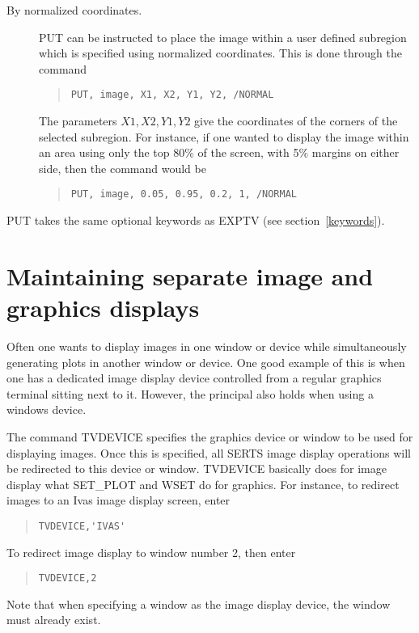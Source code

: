 \begin{description}
\item[By normalized coordinates.]
PUT can be instructed to place the image within a user defined subregion which
is specified using normalized coordinates.  This is done through the command
\begin{quote}
\begin{verbatim}
PUT, image, X1, X2, Y1, Y2, /NORMAL
\end{verbatim}
\end{quote}
The parameters $X1,X2,Y1,Y2$ give the coordinates of the corners of the
selected subregion.  For instance, if one wanted to display the image within an
area using only the top 80\% of the screen, with 5\% margins on either side,
then the command would be
\begin{quote}
\begin{verbatim}
PUT, image, 0.05, 0.95, 0.2, 1, /NORMAL
\end{verbatim}
\end{quote}
\end{description}

PUT takes the same optional keywords as EXPTV (see section~\ref{keywords}).

\section{Maintaining separate image and graphics displays}
\label{tvdevice}

Often one wants to display images in one window or device while simultaneously
generating plots in another window or device.  One good example of this is when
one has a dedicated image display device controlled from a regular graphics
terminal sitting next to it.  However, the principal also holds when using a
windows device.

The command TVDEVICE specifies the graphics device or window to be used for
displaying images.  Once this is specified, all SERTS image display operations
will be redirected to this device or window.  TVDEVICE basically does for image
display what SET\_PLOT and WSET do for graphics.  For instance, to redirect
images to an Ivas image display screen, enter
\begin{quote}
\begin{verbatim}
TVDEVICE,'IVAS'
\end{verbatim}
\end{quote}
To redirect image display to window number 2, then enter
\begin{quote}
\begin{verbatim}
TVDEVICE,2
\end{verbatim}
\end{quote}
Note that when specifying a window as the image display device, the window must
already exist.

